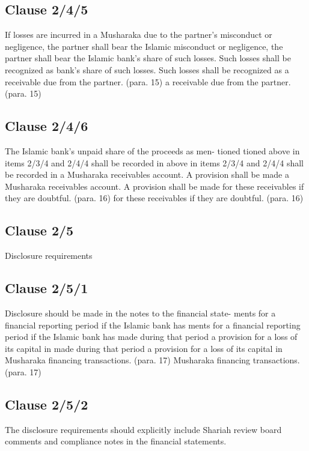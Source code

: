 \documentclass{article}%
\begin{document}
%
\subsection{Clause 2/4/5}%
\label{subsec:Clause2/4/5}%
If losses are incurred in a Musharaka due to the partner’s  misconduct or negligence, the partner shall bear the Islamic  misconduct or negligence, the partner shall bear the Islamic  bank’s share of such losses. Such losses shall be recognized as  bank’s share of such losses. Such losses shall be recognized as  a receivable due from the partner. (para. 15) a receivable due from the partner. (para. 15)

%
\subsection{Clause 2/4/6}%
\label{subsec:Clause2/4/6}%
The Islamic bank’s unpaid share of the proceeds as men- tioned  tioned above in items 2/3/4 and 2/4/4 shall be recorded in above in items 2/3/4 and 2/4/4 shall be recorded in a Musharaka receivables account. A provision shall be made  a Musharaka receivables account. A provision shall be made  for these receivables if they are doubtful. (para. 16) for these receivables if they are doubtful. (para. 16)

%
\subsection{Clause 2/5}%
\label{subsec:Clause2/5}%
Disclosure requirements

%
\subsection{Clause 2/5/1}%
\label{subsec:Clause2/5/1}%
Disclosure should be made in the notes to the financial state- ments for a financial reporting period if the Islamic bank has  ments for a financial reporting period if the Islamic bank has  made during that period a provision for a loss of its capital in  made during that period a provision for a loss of its capital in  Musharaka financing transactions. (para. 17) Musharaka financing transactions. (para. 17)

%
\subsection{Clause 2/5/2}%
\label{subsec:Clause2/5/2}%
The disclosure requirements should explicitly include Shariah review board comments and compliance notes in the financial statements.

%
\end{document}
